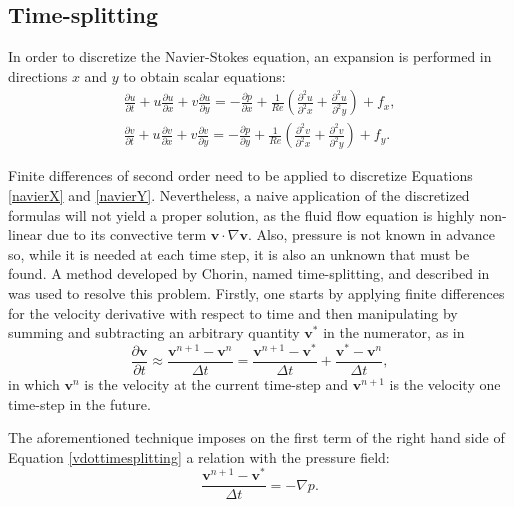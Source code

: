 \documentclass[journal]{IEEEtran}
\begin{document}
\subsection{Time-splitting}
In order to discretize the Navier-Stokes equation, an expansion is performed in directions $x$ and $y$ to obtain scalar equations: \begin{eqnarray}
\frac{\partial u}{\partial t}+u\frac{\partial u}{\partial x}+v\frac{\partial
u}{\partial y}=-\frac{\partial p}{\partial
x}+\frac{1}{\mathit{Re}}\left(\frac{\partial^2 u}{\partial^2 x}+\frac{\partial^2 u}{\partial^2
y}\right)+f_x, \label{navierX}\\
\frac{\partial v}{\partial t}+u\frac{\partial v}{\partial x}+v\frac{\partial
v}{\partial y}=-\frac{\partial p}{\partial
y}+\frac{1}{\mathit{Re}}\left(\frac{\partial^2 v}{\partial^2 x}+\frac{\partial^2 v}{\partial^2
y}\right)+f_y. \label{navierY}
\end{eqnarray} 

Finite differences of second order need to be applied to discretize Equations \ref{navierX} and \ref{navierY}. Nevertheless, a naive application of the discretized formulas will not yield a proper solution, as the fluid flow equation is highly non-linear due to its convective term $\mathbf{v}\cdot \nabla \mathbf{v}$. Also, pressure is not known in advance so, while it is needed at each time step, it is also an unknown that must be found. A method developed by Chorin, named time-splitting, and described in \cite{Chorin1997118} was used to resolve this problem. Firstly, one starts by applying finite differences for the velocity derivative with respect to time and then manipulating by summing and subtracting an arbitrary quantity $\mathbf{v}^*$ in the numerator, as in \begin{equation}
\frac{\partial \textbf{v}}{\partial t}\approx \frac{\textbf{v}^{n+1}-\textbf{v}^n}{\Delta t}=\frac{\textbf{v}^{n+1}-\textbf{v}^*}{\Delta t}+\frac{\textbf{v}^{*}-\textbf{v}^n}{\Delta t}, \label{vdottimesplitting}
\end{equation} in which $\mathbf{v}^n$ is the velocity at the current time-step and $\mathbf{v}^{n+1}$ is the velocity one time-step in the future.

The aforementioned technique imposes on the first term of the right hand side of Equation \ref{vdottimesplitting} a relation with the pressure field: 
\begin{equation}\frac{\textbf{v}^{n+1}-\textbf{v}^*}{\Delta t}=-\nabla p\label{equacaoprepressao}.\end{equation}
\end{document}
